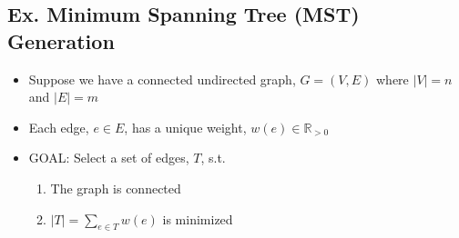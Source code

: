 \documentclass[11pt]{article}
\begin{document}
\subsection{Ex. Minimum Spanning Tree (MST) Generation}
\begin{itemize}
    \item Suppose we have a connected undirected graph, \(G = (V, E)\) where \(|V| = n\) and \(|E| = m\)
    \item Each edge, \(e \in E\), has a unique weight, \(w(e) \in \mathbb{R}_{>0}\)
    \item GOAL: Select a set of edges, \(T\), s.t.
    \begin{enumerate}
        \item The graph is connected
        \item \(|T| = \sum_{e \in T} w(e)\) is minimized
    \end{enumerate}
\end{itemize}
\end{document}
